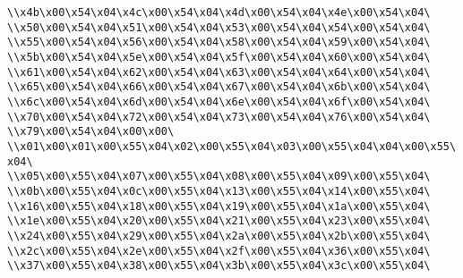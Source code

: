 \verb|\\x4b\x00\x54\x04\x4c\x00\x54\x04\x4d\x00\x54\x04\x4e\x00\x54\x04\|\newline
\verb|\\x50\x00\x54\x04\x51\x00\x54\x04\x53\x00\x54\x04\x54\x00\x54\x04\|\newline
\verb|\\x55\x00\x54\x04\x56\x00\x54\x04\x58\x00\x54\x04\x59\x00\x54\x04\|\newline
\verb|\\x5b\x00\x54\x04\x5e\x00\x54\x04\x5f\x00\x54\x04\x60\x00\x54\x04\|\newline
\verb|\\x61\x00\x54\x04\x62\x00\x54\x04\x63\x00\x54\x04\x64\x00\x54\x04\|\newline
\verb|\\x65\x00\x54\x04\x66\x00\x54\x04\x67\x00\x54\x04\x6b\x00\x54\x04\|\newline
\verb|\\x6c\x00\x54\x04\x6d\x00\x54\x04\x6e\x00\x54\x04\x6f\x00\x54\x04\|\newline
\verb|\\x70\x00\x54\x04\x72\x00\x54\x04\x73\x00\x54\x04\x76\x00\x54\x04\|\newline
\verb|\\x79\x00\x54\x04\x00\x00\|\newline
\verb|\\x01\x00\x01\x00\x55\x04\x02\x00\x55\x04\x03\x00\x55\x04\x04\x00\x55\x04\|\newline
\verb|\\x05\x00\x55\x04\x07\x00\x55\x04\x08\x00\x55\x04\x09\x00\x55\x04\|\newline
\verb|\\x0b\x00\x55\x04\x0c\x00\x55\x04\x13\x00\x55\x04\x14\x00\x55\x04\|\newline
\verb|\\x16\x00\x55\x04\x18\x00\x55\x04\x19\x00\x55\x04\x1a\x00\x55\x04\|\newline
\verb|\\x1e\x00\x55\x04\x20\x00\x55\x04\x21\x00\x55\x04\x23\x00\x55\x04\|\newline
\verb|\\x24\x00\x55\x04\x29\x00\x55\x04\x2a\x00\x55\x04\x2b\x00\x55\x04\|\newline
\verb|\\x2c\x00\x55\x04\x2e\x00\x55\x04\x2f\x00\x55\x04\x36\x00\x55\x04\|\newline
\verb|\\x37\x00\x55\x04\x38\x00\x55\x04\x3b\x00\x55\x04\x3c\x00\x55\x04\|\newline

